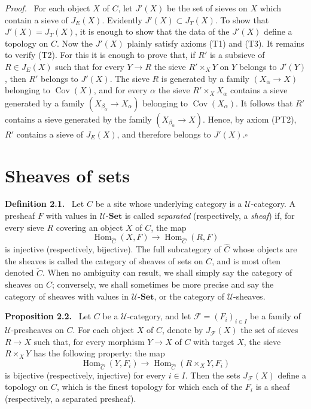 \documentclass[11pt]{article}
\newcommand{\U}{\mathcal{U}}
\newcommand{\Set}{\mathbf{Set}}
\newcommand{\Hom}{\operatorname{Hom}}
\newcommand{\Cov}{\operatorname{Cov}}
\newcommand{\whC}{\widehat{C}}
\newcommand{\Fcal}{\mathcal{F}}
\newcommand{\qedtext}{\hfill\(\square\)}
\newenvironment{statement}[1]{\par\medskip\noindent\textbf{#1.}\ }{\par\medskip}
\newenvironment{prooftext}{\par\noindent\emph{Proof.}\ }{\par\medskip}
\begin{document}
\begin{prooftext}
For each object \(X\) of \(C\), let \(J'(X)\) be the set of sieves on \(X\) which contain a sieve of \(J_E(X)\). Evidently \(J'(X)\subset J_T(X)\). To show that \(J'(X)=J_T(X)\), it is enough to show that the data of the \(J'(X)\) define a topology on \(C\). Now the \(J'(X)\) plainly satisfy axioms (T1) and (T3). It remains to verify (T2). For this it is enough to prove that, if \(R'\) is a subsieve of \(R\in J_E(X)\) such that for every \(Y\to R\) the sieve \(R'\times_XY\) on \(Y\) belongs to \(J'(Y)\), then \(R'\) belongs to \(J'(X)\). The sieve \(R\) is generated by a family \((X_\alpha\to X)\) belonging to \(\Cov(X)\), and for every \(\alpha\) the sieve \(R'\times_XX_\alpha\) contains a sieve generated by a family \((X_{\beta_\alpha}\to X_\alpha)\) belonging to \(\Cov(X_\alpha)\). It follows that \(R'\) contains a sieve generated by the family \((X_{\beta_\alpha}\to X)\). Hence, by axiom (PT2), \(R'\) contains a sieve of \(J_E(X)\), and therefore belongs to \(J'(X)\).\qedtext
\end{prooftext}

\section{Sheaves of sets}

\begin{statement}{Definition 2.1}
Let \(C\) be a site whose underlying category is a \(\U\)-category. A presheaf \(F\) with values in \(\U\)-\(\Set\) is called \emph{separated} (respectively, a \emph{sheaf}) if, for every sieve \(R\) covering an object \(X\) of \(C\), the map
\[
\Hom_{\whC}(X,F)\longrightarrow \Hom_{\whC}(R,F)
\]
is injective (respectively, bijective). The full subcategory of \(\whC\) whose objects are the sheaves is called the category of sheaves of sets on \(C\), and is most often denoted \(\widetilde C\). When no ambiguity can result, we shall simply say the category of sheaves on \(C\); conversely, we shall sometimes be more precise and say the category of sheaves with values in \(\U\)-\(\Set\), or the category of \(\U\)-sheaves.
\end{statement}

\begin{statement}{Proposition 2.2}
Let \(C\) be a \(\U\)-category, and let \(\Fcal=(F_i)_{i\in I}\) be a family of \(\U\)-presheaves on \(C\). For each object \(X\) of \(C\), denote by \(J_{\Fcal}(X)\) the set of sieves \(R\to X\) such that, for every morphism \(Y\to X\) of \(C\) with target \(X\), the sieve \(R\times_XY\) has the following property: the map
\[
\Hom_{\whC}(Y,F_i)\longrightarrow \Hom_{\whC}(R\times_XY,F_i)
\]
is bijective (respectively, injective) for every \(i\in I\). Then the sets \(J_{\Fcal}(X)\) define a topology on \(C\), which is the finest topology for which each of the \(F_i\) is a sheaf (respectively, a separated presheaf).
\end{statement}
\end{document}
